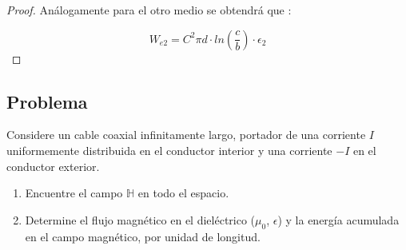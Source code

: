 \begin{proof}
    Análogamente para el otro medio se obtendrá que :
    
    \begin{equation}
        W_{e2}= C^{2} \pi d \cdot ln\left(\frac{c}{b}\right) \cdot \epsilon_{2}
    \end{equation}
\end{proof}

\subsection{Problema}
\begin{problema} %
    Considere un cable coaxial infinitamente largo, portador de una corriente \(I\) uniformemente distribuida en el conductor interior y una corriente \(-I\) en el conductor exterior.
\begin{enumerate}
    \item Encuentre el campo \(\mathbb{H}\) en todo el espacio.
    \item Determine el flujo magnético en el dieléctrico (\(\mu_{0}\), \(\epsilon\)) y la energía acumulada en el campo magnético, por unidad de longitud.
\end{enumerate}
\begin{center}
\end{center}
\end{problema}
